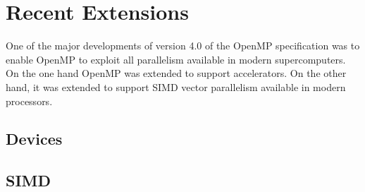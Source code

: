 \section{Recent Extensions}
\label{sec:recent_extensions}

One of the major developments of version 4.0 of the OpenMP specification was to enable OpenMP to exploit all parallelism available in modern supercomputers. On the one hand OpenMP was extended to support accelerators. On the other hand, it was extended to support SIMD vector parallelism available in modern processors. 

\subsection{Devices}
\label{sub:devices}

\subsection{SIMD}
\label{sub:simd}




